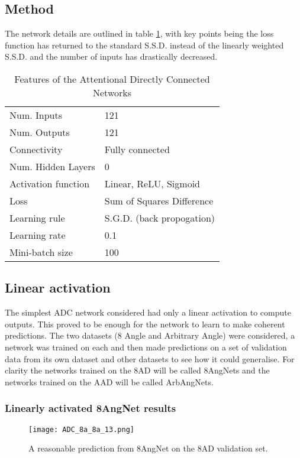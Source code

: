 \subsection{Method}
The network details are outlined in table \ref{tb:attnet1def}, with key points being the loss function has returned to the standard S.S.D. instead of the linearly weighted S.S.D. and the number of inputs has drastically decreased. 

\begin{table}[h]
\centering
\begin{tabular}{ | l | l | }
    \hline
    Num. Inputs & 121 \\
    Num. Outputs & 121 \\
    Connectivity & Fully connected \\
    Num. Hidden Layers & 0 \\
    Activation function & Linear, ReLU, Sigmoid \\
    Loss & Sum of Squares Difference \\
    Learning rule & S.G.D. (back propogation) \\
    Learning rate & 0.1 \\
    Mini-batch size & 100 \\
    \hline
\end{tabular}
\caption{Features of the Attentional Directly Connected Networks}
\label{tb:attnet1def}
\end{table}

\subsection{Linear activation}
The simplest ADC network considered had only a linear activation to compute outputs. 
This proved to be enough for the network to learn to make coherent predictions. 
The two datasets (8 Angle and Arbitrary Angle) were considered, a network was trained on each and then made predictions on a set of validation data from its own dataset and other datasets to see how it could generalise.
For clarity the networks trained on the 8AD will be called 8AngNets and the networks trained on the AAD will be called ArbAngNets. 

\subsubsection{Linearly activated 8AngNet results}

\begin{figure}
    \centering
    \texttt{[image: ADC\_8a\_8a\_13.png]}
    \caption{A reasonable prediction from 8AngNet on the 8AD validation set.}
    \label{fig:ADC_8a_8a_crct} 
\end{figure}

